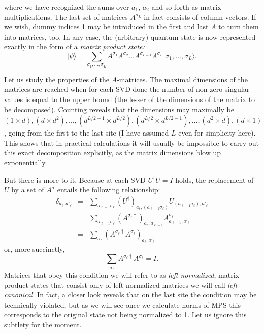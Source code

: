 \documentclass[a4paper,10pt,oneside,onecolumn,1p,times]{elsarticle}
\newcommand{\ket}[1]{\mbox{$| #1  \rangle$}}
\begin{document}
where we have recognized the sums over $a_1$, $a_2$ and so forth as matrix multiplications. The last set of matrices $A^{\sigma_L}$ in fact consists of column vectors. If we wish, dummy indices 1 may be introduced in the first and last $A$ to turn them into matrices, too. In any case, the (arbitrary) quantum state is now represented exactly in the form of a {\em matrix product state:}
\begin{equation}
\ket{\psi} = \sum_{\sigma_1,\ldots,\sigma_L} A^{\sigma_1} A^{\sigma_2} \ldots A^{\sigma_{L-1}} A^{\sigma_L} \ket{\sigma_1,\ldots,\sigma_L} .
\end{equation}

Let us study the properties of the $A$-matrices. The maximal dimensions of the matrices are reached when for each SVD done the number of non-zero singular values is equal to the upper bound (the lesser of the dimensions of the matrix to be decomposed). Counting reveals that the dimensions may maximally be $(1 \times d), (d \times d^2), \ldots, (d^{L/2-1} \times d^{L/2}), (d^{L/2} \times d^{L/2-1}), \ldots, (d^2 \times d), (d \times 1)$, going from the first to the last site (I have assumed $L$ even for simplicity here). This shows that in practical calculations it will usually be impossible to carry out this exact decomposition explicitly, as the matrix dimensions blow up exponentially.

But there is more to it. Because at each SVD $U^\dagger U = I$ holds, the replacement of $U$ by a set of $A^\sigma$ entails the following relationship:
\begin{eqnarray*}
\delta_{a_\ell,a'_\ell} &=& \sum_{a_{\ell-1}\sigma_\ell} (U^\dagger)_{a_\ell, (a_{\ell-1}\sigma_\ell)} U_{(a_{\ell-1}\sigma_\ell), a'_\ell} \\
&=& \sum_{a_{\ell-1}\sigma_\ell} (A^{\sigma_\ell\dagger})_{a_\ell, a_{\ell-1}} A^{\sigma_\ell}_{a_{\ell-1}, a'_\ell} \\
&=& \sum_{\sigma_\ell} ( A^{\sigma_\ell\dagger} A^{\sigma_\ell})_{a_\ell,a'_\ell} 
\end{eqnarray*}
or, more succinctly,
\begin{equation}
\sum_{\sigma_\ell} A^{\sigma_\ell \dagger} A^{\sigma_\ell} = I . 
\end{equation}
Matrices that obey this condition we will refer to as {\em left-normalized}, matrix product states that consist only of left-normalized matrices we will call {\em left-canonical}. In fact, a closer look reveals that on the last site the condition may be technically violated, but as we will see once we calculate norms of MPS this corresponds to the original state not being normalized to 1. Let us ignore this subtlety for the moment.
\end{document}
